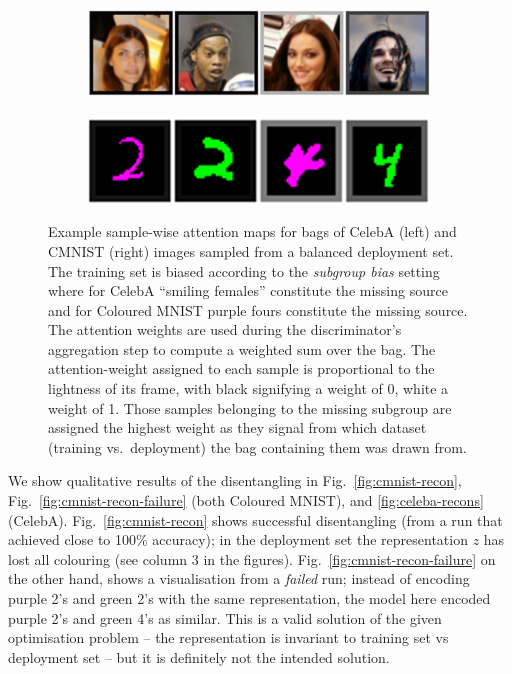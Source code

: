 \begin{figure}[htp]
  \centering
    \begin{subfigure}[b]{0.49\textwidth}
    \includegraphics[width=\textwidth]{supmatch/figures/celeba_attn_map.png}
    \end{subfigure}
    \hfill
    \begin{subfigure}[b]{0.49\textwidth}
    \includegraphics[width=\textwidth]{supmatch/figures/cmnist_attn_map.png}
    \end{subfigure}
  \caption{
    Example sample-wise attention maps for bags of CelebA (left) and CMNIST (right) images sampled
    from a balanced deployment set. 
    The training set is biased according to the \emph{subgroup bias} setting where for CelebA
    ``smiling females'' constitute the missing source and for Coloured MNIST {\color{purple}purple}
    fours constitute the missing source. 
    The attention weights are used during the discriminator's aggregation step to compute a
    weighted sum over the bag. 
    The attention-weight assigned to each sample is proportional to the lightness of its frame,
    with black signifying a weight of 0, white a weight of 1. 
    Those samples belonging to the missing subgroup are assigned the highest weight as they signal
    from which dataset (training vs.\ deployment) the bag containing them was drawn from. 
%
}
  \label{fig:attn_maps}
\end{figure}%
%
We show qualitative results of the disentangling in Fig.~\ref{fig:cmnist-recon},
Fig.~\ref{fig:cmnist-recon-failure} (both Coloured MNIST), and \ref{fig:celeba-recons} (CelebA).
Fig.~\ref{fig:cmnist-recon} shows successful disentangling (from a run that achieved close to 100\%
accuracy); in the deployment set the representation $z$ has lost all colouring (see column 3 in the
figures). 
%
Fig.~\ref{fig:cmnist-recon-failure} on the other hand, shows a visualisation from a \emph{failed}
run; instead of encoding purple 2's and green 2's with the same representation, the model here
encoded purple 2's and green 4's as similar. 
%
This is a valid solution of the given optimisation problem -- the representation is invariant to
training set vs deployment set -- but it is definitely not the intended solution.

